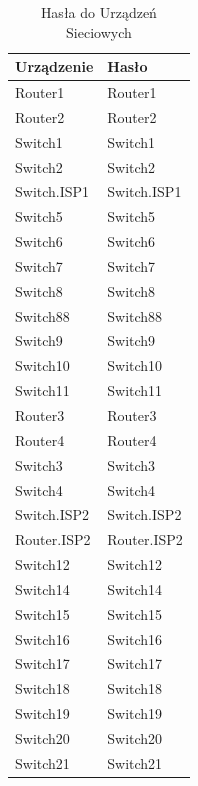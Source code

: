 \begin{table}[!ht]
    \centering
    \caption{Hasła do Urządzeń Sieciowych}
    \begin{tabular}{|l|l|}
        \hline
        \textbf{Urządzenie} & \textbf{Hasło} \\ \hline
        Router1 & Router1 \\ \hline
        Router2 & Router2 \\ \hline
        Switch1 & Switch1 \\ \hline
        Switch2 & Switch2 \\ \hline
        Switch.ISP1 & Switch.ISP1 \\ \hline
        Switch5 & Switch5 \\ \hline
        Switch6 & Switch6 \\ \hline
        Switch7 & Switch7 \\ \hline
        Switch8 & Switch8 \\ \hline
        Switch88 & Switch88 \\ \hline
        Switch9 & Switch9 \\ \hline
        Switch10 & Switch10 \\ \hline
        Switch11 & Switch11 \\ \hline
        Router3 & Router3 \\ \hline
        Router4 & Router4 \\ \hline
        Switch3 & Switch3 \\ \hline
        Switch4 & Switch4 \\ \hline
        Switch.ISP2 & Switch.ISP2 \\ \hline
        Router.ISP2 & Router.ISP2 \\ \hline
        Switch12 & Switch12 \\ \hline
        Switch14 & Switch14 \\ \hline
        Switch15 & Switch15 \\ \hline
        Switch16 & Switch16 \\ \hline
        Switch17 & Switch17 \\ \hline
        Switch18 & Switch18 \\ \hline
        Switch19 & Switch19 \\ \hline
        Switch20 & Switch20 \\ \hline
        Switch21 & Switch21 \\ \hline
    \end{tabular}
\end{table}
\newpage
